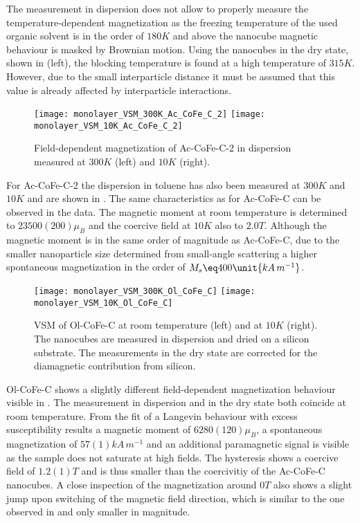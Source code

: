 \documentclass[\main/dresen_thesis.tex]{subfiles}
\begin{document}
  The measurement in dispersion does not allow to properly measure the temperature-dependent magnetization as the freezing temperature of the used organic solvent is in the order of $180 \unit{K}$ and above the nanocube magnetic behaviour is masked by Brownian motion.
  Using the nanocubes in the dry state, shown in  (left), the blocking temperature is found at a high temperature of $315 \unit{K}$.
  However, due to the small interparticle distance it must be assumed that this value is already affected by interparticle interactions.

  \begin{figure}[tb]
    \centering
    \texttt{[image: monolayer\_VSM\_300K\_Ac\_CoFe\_C\_2]}
    \texttt{[image: monolayer\_VSM\_10K\_Ac\_CoFe\_C\_2]}
    \caption{\label{fig:monolayers:nanoparticle:vsmAcCoFeC2}Field-dependent magnetization of Ac-CoFe-C-2 in dispersion measured at $300 \unit{K}$ (left) and $10 \unit{K}$ (right).}
  \end{figure}
  For Ac-CoFe-C-2 the dispersion in toluene has also been measured at $300 \unit{K}$ and $10 \unit{K}$ and are shown in .
  The same characteristics as for Ac-CoFe-C can be observed in the data.
  The magnetic moment at room temperature is determined to $23500(200) \mu_B$ and the coercive field at $10 \unit{K}$ also to $2.0 \unit{T}$.
  Although the magnetic moment is in the same order of magnitude as Ac-CoFe-C, due to the smaller nanoparticle size determined from small-angle scattering a higher spontaneous magnetization in the order of $M_s \eq 400 \unit{kA \, m^{-1}}$.

  \begin{figure}[tb]
    \centering
    \texttt{[image: monolayer\_VSM\_300K\_Ol\_CoFe\_C]}
    \texttt{[image: monolayer\_VSM\_10K\_Ol\_CoFe\_C]}
    \caption{\label{fig:monolayers:nanoparticle:vsmOlCoFeC}VSM of Ol-CoFe-C at room temperature (left) and at $10 \unit{K}$ (right). The nanocubes are measured in dispersion and dried on a silicon substrate. The measurements in the dry state are corrected for the diamagnetic contribution from silicon.}
  \end{figure}

  Ol-CoFe-C shows a slightly different field-dependent magnetization behaviour visible in .
  The measurement in dispersion and in the dry state both coincide at room temperature.
  From the fit of a Langevin behaviour with excess susceptibility results a magnetic moment of $6280(120) \mu_B$, a spontaneous magnetization of $57(1) \unit{kA \, m^{-1}}$ and an additional paramagnetic signal is visible as the sample does not saturate at high fields.
  The hysteresis shows a coercive field of $1.2(1) \unit{T}$ and is thus smaller than the coercivitiy of the Ac-CoFe-C nanocubes.
  A close inspection of the magnetization around $0 \unit{T}$ also shows a slight jump upon switching of the magnetic field direction, which is similar to the one observed in  and only smaller in magnitude.
\end{document}
